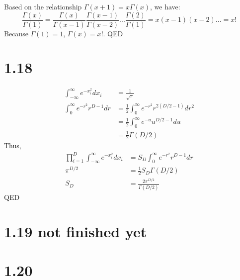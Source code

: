 \documentclass[10pt,a4paper,draft]{book}
\begin{document}
Based on the relationship $\Gamma(x+1) = x\Gamma(x)$, we have:
\begin{equation}
\frac{\Gamma(x)}{\Gamma(1)} = \frac{\Gamma(x)}{\Gamma(x-1)}\frac{\Gamma(x-1)}{\Gamma(x-2)}...\frac{\Gamma(2)}{\Gamma(1)} = x(x-1)(x-2)... = x!
\end{equation}
Because $\Gamma(1)=1$, $\Gamma(x) = x!$. QED

\section*{1.18}
\begin{equation}
\begin{aligned}
\int_{-\infty}^{\infty} e^{-x_i^2}dx_i &= \frac{1}{\sqrt{\pi}} \\
\int_0^{\infty} e^{-r^2}r^{D-1}dr &= \frac{1}{2}\int_0^{\infty} e^{-r^2} r^{2 (D/2 - 1)} dr^2 \\
&= \frac{1}{2}\int_0^{\infty} e^{-u} u^{D/2 - 1} du \\
&= \frac{1}{2}\Gamma(D/2)
\end{aligned}
\end{equation}
Thus,
\begin{equation}
\begin{aligned}
\prod_{i=1}^{D}\int_{-\infty}^{\infty} e^{-x^2_i} dx_i &= S_D\int_0^{\infty}e^{-r^2}r^{D-1}dr \\
\pi^{D/2} &= \frac{1}{2} S_D \Gamma(D/2) \\
S_D &= \frac{2\pi^{D/2}}{\Gamma(D/2)}
\end{aligned}
\end{equation}
QED

\section*{1.19 not finished yet}

\section*{1.20}
\end{document}
